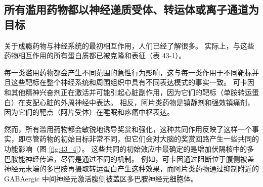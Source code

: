 \subsection{所有滥用药物都以神经递质受体、转运体或离子通道为目标}
关于成瘾药物与神经系统的最初相互作用，人们已经了解很多。 实际上，与这些药物相互作用的所有蛋白质都已被克隆和表征（表 43-1）。

每一类滥用药物都会产生不同范围的急性行为影响，这与每一类作用于不同靶标并且这些靶标在整个神经系统和周围组织中具有不同表达模式的事实一致。 可卡因和其他精神兴奋剂正在激活并可能引起心脏副作用，因为它们的靶标（单胺转运蛋白）在支配心脏的外周神经中表达。 相反，阿片类药物是镇静剂和强效镇痛剂，因为它们的靶点（阿片受体）在睡眠和疼痛中枢表达。

然而，所有滥用药物都会敏锐地诱导奖赏和强化，这种共同作用反映了这样一个事实，即尽管药物的初始目标非常不同，但它们会对大脑的奖赏回路产生一些共同的功能影响（图 \ref{fig:43_4}）。 
这些共同的初始效应中最确定的是增加伏隔核中的多巴胺能神经传递，尽管是通过不同的机制。 例如，可卡因通过阻断位于腹侧被盖神经元末端的多巴胺再摄取转运蛋白产生这种效果，而阿片类药物通过抑制附近的 GABAergic 中间神经元激活腹侧被盖区多巴胺神经元细胞体。

